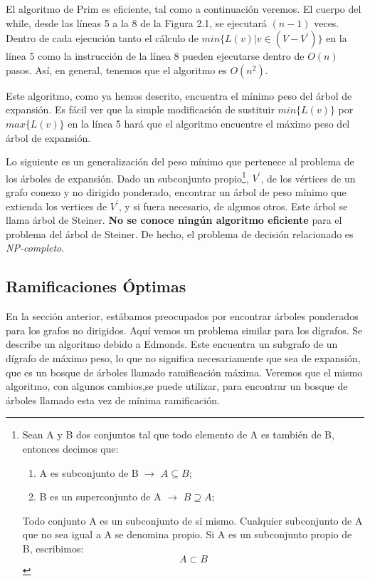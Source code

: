 \documentclass[10pt,a5paper]{book}
\begin{document}
El algoritmo de Prim es eficiente, tal como a continuación veremos. El cuerpo del while, desde las líneas 5 a la 8 de la Figura 2.1, se ejecutará $(n-1)$ veces. Dentro de cada ejecución tanto el cálculo de $min\{L(v)|v \in (V - V^{'})\}$ en la línea 5 como la instrucción de la línea 8 pueden ejecutarse dentro de $O(n)$ pasos. Así, en general, tenemos que el algoritmo es $O(n^2)$.

Este algoritmo, como ya hemos descrito, encuentra el mínimo peso del árbol de expansión. Es fácil ver que la simple modificación de sustituir $min\{L(v)\}$ por $max\{L(v)\}$ en la línea 5 hará que el algoritmo encuentre el máximo peso del árbol de expansión.

Lo siguiente es un generalización del peso mínimo que pertenece al problema de los árboles de expansión. Dado un subconjunto propio\footnote{
Sean A y B dos conjuntos tal que todo elemento de A es también de B, entonces decimos que:
\begin{enumerate}
\item A es subconjunto de B $\rightarrow$ $A \subseteq B$;
\item B es un superconjunto de A $\rightarrow$ $B \supseteq A$;
\end{enumerate}
Todo conjunto A es un subconjunto de sí mismo. Cualquier subconjunto de A que no sea igual a A se denomina propio. Si A es un subconjunto propio de B, escribimos:
\[A \subset B\]}, $V^{'}$, de los vértices de un grafo conexo y no dirigido ponderado, encontrar un árbol de peso mínimo que extienda los vertices de $V^{'}$, y si fuera necesario, de algunos otros. Este árbol se llama árbol de Steiner. \textbf{No se conoce ningún algoritmo eficiente} para el problema del árbol de Steiner. De hecho, el problema de decisión relacionado es \emph{NP-completo}.

\subsection{Ramificaciones Óptimas}

En la sección anterior, estábamos preocupados por encontrar árboles ponderados para los grafos no dirigidos. Aquí vemos un problema similar para los dígrafos. Se describe un algoritmo debido a Edmonds\cite{b}. Este encuentra un subgrafo de un dígrafo de máximo peso, lo que no significa necesariamente que sea de expansión, que es un bosque de árboles llamado ramificación máxima. Veremos que el mismo algoritmo, con algunos cambios,se puede utilizar, para encontrar un bosque de árboles llamado esta vez de mínima ramificación.
\end{document}
